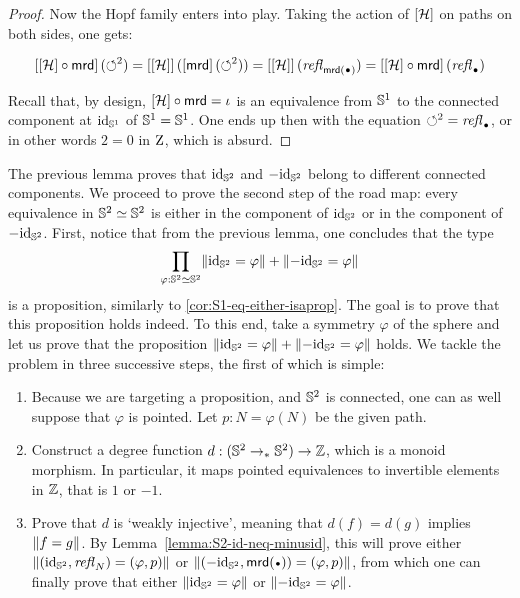 \documentclass[english,a4]{article}
\renewcommand{\ap}[1]{\left[{#1}\right]}
\newcommand{\ptdto}{\to_\ast}%
\begin{document}
\begin{proof}
  Now the Hopf family enters into play. Taking the action of $\ap\hopf$ on
  paths on both sides, one gets:
  
  \begin{displaymath}
    \ap{\ap\hopf\circ \mrd}(\Sloop^2) = \ap{\ap\hopf}(\ap\mrd(\Sloop^2)) =
    \ap{\ap\hopf}(\refl{\mrd(\base)}) = \ap{\ap\hopf\circ \mrd}(\refl{\base})
  \end{displaymath}
  
  Recall that, by design, ${\ap\hopf}\circ{\mrd} = \iota$ is an equivalence
  from ${{\mathbb S^{1}}}$ to the connected component at $\mathord{\mathrm{id}}_{{\mathbb S^{1}}}$ of ${{\mathbb S^{1}}}={{\mathbb S^{1}}}$. One ends up
  then with the equation $\Sloop^2 = \refl \base$, or in other words $2=0$ in
  $\mathrm{Z}$, which is absurd.
  
\end{proof}

The previous lemma proves that $\mathord{\mathrm{id}}_{{\mathbb S^{2}}}$ and $-\mathord{\mathrm{id}}_{{\mathbb S^{2}}}$ belong 
to different connected components. We proceed to prove the second step
of the road map: every equivalence in ${{\mathbb S^{2}}} \simeq {{\mathbb S^{2}}}$ is
either in the component of $\mathord{\mathrm{id}}_{{\mathbb S^{2}}}$ or in the component of $-\mathord{\mathrm{id}}_{{\mathbb S^{2}}}$. 
First, notice that from the previous lemma, one concludes that the type 
\begin{displaymath}
  \prod_{\varphi:{{\mathbb S^{2}}}\simeq{{\mathbb S^{2}}}}\lVert\mathord{\mathrm{id}}_{{\mathbb S^{2}}} = \varphi\rVert + \lVert-\mathord{\mathrm{id}}_{{\mathbb S^{2}}} = \varphi\rVert
\end{displaymath}
is a proposition, similarly to \cref{cor:S1-eq-either-isaprop}. 
The goal is to prove that this proposition
holds indeed. To this end, take a symmetry $\varphi$ of the sphere and let us
prove that the proposition $\lVert\mathord{\mathrm{id}}_{{\mathbb S^{2}}} = \varphi\rVert + \lVert-\mathord{\mathrm{id}}_{{\mathbb S^{2}}} =
\varphi\rVert$ holds. We tackle the problem in three successive steps,
the first of which is simple: 
\begin{enumerate}
  \item Because we are targeting a proposition, and ${{\mathbb S^{2}}}$ is
    connected, one can as well suppose that $\varphi$ is pointed. 
    Let $p:N=\varphi(N)$ be the given path.
  \item Construct a degree function $d: (\Sp \ptdto \Sp) \to \ZZ$, which is a
    monoid morphism. In particular, it maps pointed equivalences to invertible
    elements in $\mathbb{Z}$, that is $1$ or $-1$.
  \item Prove that $d$ is `weakly injective', meaning that $d(f)=d(g)$ 
    implies $\lVert f=g\rVert$. By Lemma~\ref{lemma:S2-id-neq-minusid},
    this will prove either $\lVert(\mathord{\mathrm{id}}_{{\mathbb S^{2}}},\mathop{{\mathit{refl}}_{N}})=(\varphi,p)\rVert$ 
    or $\Trunc{(-\id_\Sp,\mrd(\base))=(\varphi,p)}$, from which
    one can finally prove that either $\lVert\mathord{\mathrm{id}}_{{\mathbb S^{2}}} = \varphi\rVert$ or
    $\lVert-\mathord{\mathrm{id}}_{{\mathbb S^{2}}} = \varphi\rVert$.\label{it:weakly_injective}
\end{enumerate}
\end{document}
